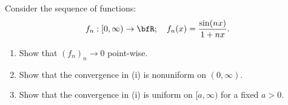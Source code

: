 \documentclass[10pt,twoside,openany]{memoir}
\begin{document}
    \begin{exercise}
        Consider the sequence of functions:
            \begin{equation*}
            \begin{split}
                f_n:[0,\infty) \rightarrow \bfR; \hspace{10pt}f_n(x) = \frac{\sin(nx)}{1 + nx}.
            \end{split}
            \end{equation*}
            \begin{enumerate}[label = (\roman*)]
                \item Show that $(f_n)_n \rightarrow 0$ point-wise.
                \item Show that the convergence in (i) is nonuniform on $(0,\infty)$.
                \item Show that the convergence in (i) is uniform on $[a,\infty)$ for a fixed $a > 0$.
            \end{enumerate}
    \end{exercise}
\end{document}
